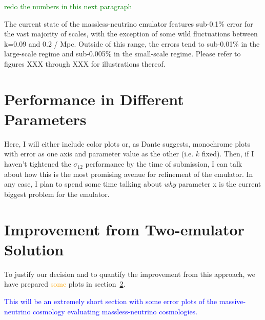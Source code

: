 \textcolor{green}{redo the numbers in this next paragraph}

The current state of the massless-neutrino emulator features sub-0.1\% error 
for the vast majority of scales, with the exception of some wild fluctuations  
between k=0.09 and 0.2 / Mpc. Outside of this range, the errors tend to 
sub-0.01\% in the large-scale regime and sub-0.005\% in the small-scale 
regime. Please refer to figures XXX through XXX for illustrations thereof.


\section{Performance in Different Parameters}

Here, I will either include color plots or, as Dante suggests, monochrome 
plots with error as one axis and parameter value as the other (i.e. $k$ 
fixed). Then, if I haven't tightened the $\sigma_{12}$ performance by the time 
of submission, I can talk about how this is the most promising avenue for 
refinement of the emulator. In any case, I plan to spend some time talking 
about \textit{why} parameter x is the current biggest problem for the 
emulator. 


\section{Improvement from Two-emulator Solution}
\label{sec: 2emu_improvement}

To justify our decision and to quantify the improvement from this approach, we
have prepared \textcolor{orange}{some} plots in
section~\ref{sec: 2emu_improvement}.

\textcolor{blue}{This will be an extremely short section with some error
plots of the massive-neutrino cosmology evaluating massless-neutrino
cosmologies.}